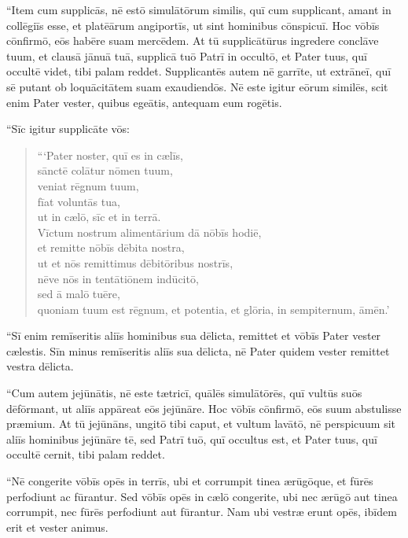 \Versus ``Item cum supplicās, nē estō simulātōrum similis, quī cum supplicant, amant in collēgiīs esse, et platēārum angiportīs, ut sint hominibus cōnspicuī. Hoc vōbīs cōnfirmō, eōs habēre suam mercēdem. 
\Versus At tū supplicātūrus ingredere conclāve tuum, et clausā jānuā tuā, supplicā tuō Patrī in occultō, et Pater tuus, quī occultē videt, tibi palam reddet. 
\Versus Supplicantēs autem nē garrīte, ut extrāneī, quī sē putant ob loquācitātem suam exaudiendōs. 
\Versus Nē este igitur eōrum similēs, scit enim Pater vester, quibus egeātis, antequam eum rogētis.

\Versus ``Sīc igitur supplicāte vōs:
\begin{verse}
\begin{patverse*}
```Pater noster, quī es in cælīs,\\
sānctē colātur nōmen tuum,\\
\Versus veniat rēgnum tuum,\\
fīat voluntās tua,\\
ut in cælō, sīc et in terrā.\\
\Versus Vīctum nostrum alimentārium dā nōbīs hodiē,\\
\Versus et remitte nōbīs dēbita nostra,\\
ut et nōs remittimus dēbitōribus nostrīs,\\
\Versus nēve nōs in tentātiōnem indūcitō,\\
sed ā malō tuēre,\\
quoniam tuum est rēgnum, et potentia, et glōria, in sempiternum, āmēn.'
\end{patverse*}
\end{verse}

\Versus ``Sī enim remīseritis aliīs hominibus sua dēlicta, remittet et vōbīs Pater vester cælestis. 
\Versus Sīn minus remīseritis aliīs sua dēlicta, nē Pater quidem vester remittet vestra dēlicta.

\Versus ``Cum autem jejūnātis, nē este tætricī, quālēs simulātōrēs, quī vultūs suōs dēfōrmant, ut aliīs appāreat eōs jejūnāre. Hoc vōbīs cōnfirmō, eōs suum abstulisse præmium. 
\Versus At tū jejūnāns, ungitō tibi caput, et vultum lavātō, 
\Versus nē perspicuum sit aliīs hominibus jejūnāre tē, sed Patrī tuō, quī occultus est, et Pater tuus, quī occultē cernit, tibi palam reddet.

\Versus ``Nē congerite vōbīs opēs in terrīs, ubi et corrumpit tinea ærūgōque, et fūrēs perfodiunt ac fūrantur. 
\Versus Sed vōbīs opēs in cælō congerite, ubi nec ærūgō aut tinea corrumpit, nec fūrēs perfodiunt aut fūrantur. 
\Versus Nam ubi vestræ erunt opēs, ibīdem erit et vester animus.

